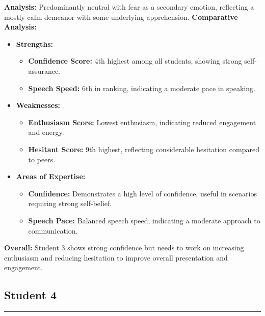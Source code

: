 \documentclass{article}
\begin{document}
    \textbf{Analysis:} Predominantly neutral with fear as a secondary emotion, reflecting a mostly calm demeanor with some underlying apprehension.
    \vspace{0.2in}
\textbf{Comparative Analysis:}
\begin{itemize}
    \item \textbf{Strengths:}
    \begin{itemize}
        \item \textbf{Confidence Score:} 4th highest among all students, showing strong self-assurance.
        \item \textbf{Speech Speed:} 6th in ranking, indicating a moderate pace in speaking.
    \end{itemize}
    \item \textbf{Weaknesses:}
    \begin{itemize}
        \item \textbf{Enthusiasm Score:} Lowest enthusiasm, indicating reduced engagement and energy.
        \item \textbf{Hesitant Score:} 9th highest, reflecting considerable hesitation compared to peers.
    \end{itemize}
    \item \textbf{Areas of Expertise:}
    \begin{itemize}
        \item \textbf{Confidence:} Demonstrates a high level of confidence, useful in scenarios requiring strong self-belief.
        \item \textbf{Speech Pace:} Balanced speech speed, indicating a moderate approach to communication.
    \end{itemize}
\end{itemize}

\textbf{Overall:} Student 3 shows strong confidence but needs to work on increasing enthusiasm and reducing hesitation to improve overall presentation and engagement.
\vspace{0.3in}
\subsection{Student 4}
\begin{center}
    \color{green}\rule{1\linewidth}{0.7mm}
\end{center}
\end{document}
